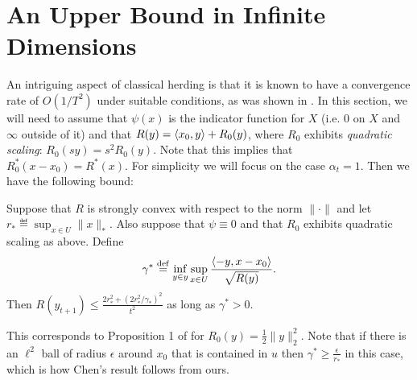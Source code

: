 \documentclass[paper.tex]{subfiles}
\begin{document}
\section{An Upper Bound in Infinite Dimensions}
\label{sec:chen-proofs}

An intriguing aspect of classical herding is that it is known to have a convergence rate of 
$O(1/T^2)$ under suitable conditions, as was shown in \citet{Chen:2010a}. In this section, 
we will need to assume that $\psi(x)$ is the indicator function for $X$ (i.e. $0$ on $X$ and 
$\infty$ outside of it) and that $R(y) = \left\langle x_0, y \right\rangle + R_0(y)$, where 
$R_0$ exhibits \emph{quadratic scaling}: $R_0(sy) = s^2R_0(y)$. Note that 
this implies that $R_0^*(x-x_0) = R^*(x)$.
For simplicity 
we will focus on the case $\alpha_t = 1$. Then we have 
the following bound:
\begin{theorem}
\label{thm:chen}
Suppose that $R$ is strongly convex with respect to the norm $\|\cdot\|$ and 
let $r_* \eqdef \sup_{x \in U} \|x\|_*$. Also suppose that $\psi \equiv 0$ and 
that $R_0$ exhibits quadratic scaling as above. Define 
\[ \gamma^* \stackrel{\mathrm{def}}{=} \inf_{y \in y} \sup_{x \in U} \frac{\left\langle -y, x-x_0 \right\rangle}{\sqrt{R(y)}}. \]
Then $R(y_{t+1}) \leq \frac{2r_*^2+(2r_*^2/\gamma_*)^2}{t^2}$ as long 
as $\gamma^* > 0$.
\end{theorem}
This corresponds to Proposition 1 of \citet{Chen:2010b} for $R_{0}(y) = \frac{1}{2}\|y\|_2^2$. Note that if there is an $\ell^2$ ball of radius $\epsilon$ 
around $x_0$ that is contained in $u$ then $\gamma^* \geq \frac{\epsilon}{r_*}$ 
in this case, which is how Chen's result follows from ours.
\end{document}
